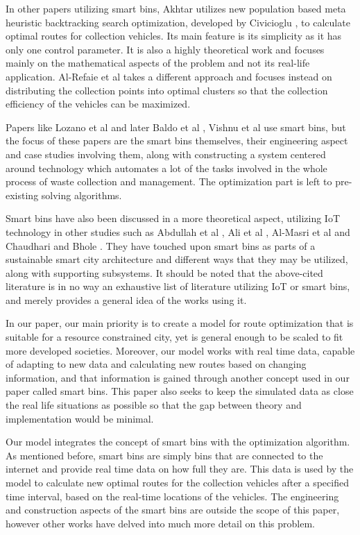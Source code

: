 \documentclass[12pt]{article}
\begin{document}
In other papers utilizing smart bins, Akhtar \cite{akhtar2017backtracking} utilizes new population based meta heuristic backtracking search optimization, developed by Civicioglu \cite{civicioglu2013backtracking}, to calculate optimal routes for collection vehicles. Its main feature is its simplicity as it has only one control parameter. It is also a highly theoretical work and focuses mainly on the mathematical aspects of the problem and not its real-life application. Al-Refaie et al \cite{al2021optimization} takes a different approach and focuses instead on distributing the collection points into optimal clusters so that the collection efficiency of the vehicles can be maximized.

Papers like Lozano et al \cite{lozano2018smart} and later Baldo et al \cite{baldo2021multi}, Vishnu et al \cite{vishnu2021iot} use smart bins, but the focus of these papers are the smart bins themselves, their engineering aspect and case studies involving them, along with constructing a system centered around technology which automates a lot of the tasks involved in the whole process of waste collection and management. The optimization part is left to pre-existing solving algorithms.

Smart bins have also been discussed in a more theoretical aspect, utilizing IoT technology in other studies such as Abdullah et al \cite{abdullah2018iot}, Ali et al \cite{ali2020iot}, Al-Masri et al \cite{al2018serverless} and Chaudhari and Bhole \cite{chaudhari2018solid}. They have touched upon smart bins as parts of a sustainable smart city architecture and different ways that they may be utilized, along with supporting subsystems. It should be noted that the above-cited literature is in no way an exhaustive list of literature utilizing IoT or smart bins, and merely provides a general idea of the works using it.

In our paper, our main priority is to create a model for route optimization that is suitable for a resource constrained city, yet is general enough to be scaled to fit more developed societies. Moreover, our model works with real time data, capable of adapting to new data and calculating new routes based on changing information, and that information is gained through another concept used in our paper called smart bins. This paper also seeks to keep the simulated data as close the real life situations as possible so that the gap between theory and implementation would be minimal.

Our model integrates the concept of smart bins with the optimization algorithm. As mentioned before, smart bins are simply bins that are connected to the internet and provide real time data on how full they are. This data is used by the model to calculate new optimal routes for the collection vehicles after a specified time interval, based on the real-time locations of the vehicles. The engineering and construction aspects of the smart bins are outside the scope of this paper, however other works have delved into much more detail on this problem.
\end{document}
